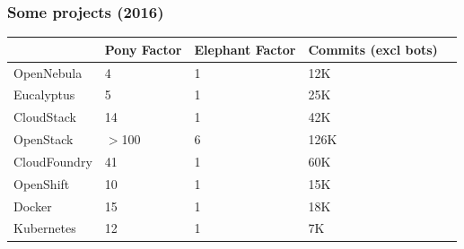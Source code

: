 \documentclass[17pt,aspectratio=169,hyperref=pdfusetitle]{beamer}
\begin{document}
\begin{frame}
\frametitle{Some projects (2016)}

{\footnotesize
\begin{tabular}{|l|l|l|l|l|}
  \hline
              & Pony Factor & Elephant Factor & Commits (excl bots) \\ \hline \hline
OpenNebula    & 4           & 1               & 12K     \\ \hline
Eucalyptus    & 5           & 1               & 25K     \\ \hline
CloudStack    & 14          & 1               & 42K     \\ \hline
OpenStack     & $>$100      & 6               & 126K    \\ \hline
CloudFoundry  & 41          & 1               & 60K     \\ \hline
OpenShift     & 10          & 1               & 15K     \\ \hline
Docker        & 15          & 1               & 18K     \\ \hline
Kubernetes    & 12          & 1               & 7K      \\ \hline
\end{tabular}
}
\end{frame}


  


\end{document}
